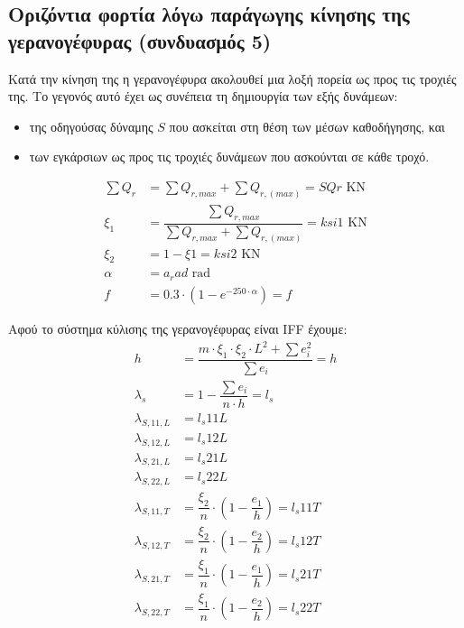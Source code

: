 
\subsection{Οριζόντια φορτία λόγω παράγωγης κίνησης της γερανογέφυρας (συνδυασμός 5)}

Κατά την κίνηση της η γερανογέφυρα ακολουθεί μια λοξή πορεία ως προς τις τροχιές της. Το γεγονός
αυτό έχει ως συνέπεια τη δημιουργία των εξής δυνάμεων:

\begin{itemize}
    \item της οδηγούσας δύναμης $S$ που ασκείται στη θέση των μέσων καθοδήγησης, και
    \item των εγκάρσιων ως προς τις τροχιές δυνάμεων που ασκούνται σε κάθε τροχό.
\end{itemize}

\begin{align*}
    \sum{Q_r}   &= \displaystyle\sum{Q_{r,max}} + \displaystyle\sum{Q_{r,(max)}} = {{ SQr }} \text{ KN} \\
    ξ_1         &= \dfrac{\displaystyle\sum{Q_{r,max}}}{\displaystyle\sum{Q_{r,max}} + \displaystyle\sum{Q_{r,(max)}}} = {{ ksi1 }} \text{ KN} \\
    ξ_2         &= 1 - ξ1 = {{ ksi2 }} \text{ KN} \\
    α           &= {{ a_rad }} \text{ rad} \\
    f           &= 0.3 \cdot \left(1 - e^{-250 \cdot α}\right) = {{ f }}
\end{align*}

Αφού το σύστημα κύλισης της γερανογέφυρας είναι IFF έχουμε:
\begin{align*}
    h          &= \dfrac{m \cdot ξ_1 \cdot ξ_2 \cdot L^2 + \sum{e_i^2}}{\sum{e_i}} = {{ h }} \\
    λ_s        &= 1 - \dfrac{\sum{e_i}}{n \cdot h} =  {{ l_s }} \\
    λ_{S,11,L} &= {{ l_s11L }} \\
    λ_{S,12,L} &= {{ l_s12L }} \\
    λ_{S,21,L} &= {{ l_s21L }} \\
    λ_{S,22,L} &= {{ l_s22L }} \\
    λ_{S,11,T} &= \dfrac{ξ_2}{n} \cdot \left(1 - \dfrac{e_1}{h}\right) = {{ l_s11T }} \\
    λ_{S,12,T} &= \dfrac{ξ_2}{n} \cdot \left(1 - \dfrac{e_2}{h}\right) = {{ l_s12T }} \\
    λ_{S,21,T} &= \dfrac{ξ_1}{n} \cdot \left(1 - \dfrac{e_1}{h}\right) = {{ l_s21T }} \\
    λ_{S,22,T} &= \dfrac{ξ_1}{n} \cdot \left(1 - \dfrac{e_2}{h}\right) = {{ l_s22T }}
\end{align*}

